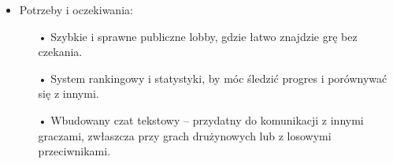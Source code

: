\documentclass[12pt,a4paper,colorlinks=true,linkcolor=NavyBlue,citecolor=red,urlcolor=NavyBlue]{book}
\begin{document}
\begin{enumerate}
\begin{itemize}
\begin{itemize}
        \end{itemize}
        \item Potrzeby i oczekiwania:
        \begin{itemize}
            \item[•] Szybkie i sprawne publiczne lobby, gdzie łatwo znajdzie grę bez czekania.
            \item[•] System rankingowy i statystyki, by móc śledzić progres i porównywać się z innymi.
            \item[•] Wbudowany czat tekstowy – przydatny do komunikacji z innymi graczami, zwłaszcza przy grach drużynowych lub z losowymi przeciwnikami.
        \end{itemize}
    \end{itemize}
\end{enumerate}
\end{document}
